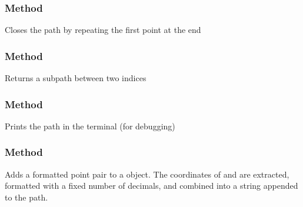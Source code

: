{%

\subsubsection{Method } %
\label{ssub:method_tkzmeth_path_close}

Closes the path by repeating the first point at the end

\begin{tkzexample}[latex=.3\textwidth]
\end{tkzexample}



\subsubsection{Method } %
\label{ssub:method_tkzmeth_path_sub_i1_i2}

Returns a subpath between two indices


\begin{tkzexample}[latex=.3\textwidth]
\end{tkzexample}

\subsubsection{Method } %
\label{ssub:method_tkzmeth_path_show}

Prints the path in the terminal (for debugging)

\begin{tkzexample}[latex=.45\textwidth]
\end{tkzexample}


\subsubsection{Method } %
\label{ssub:subsubsection_name}
Adds a formatted point pair to a  object. The coordinates of  and  are extracted, formatted with a fixed number of decimals, and combined into a string  appended to the path.

}
